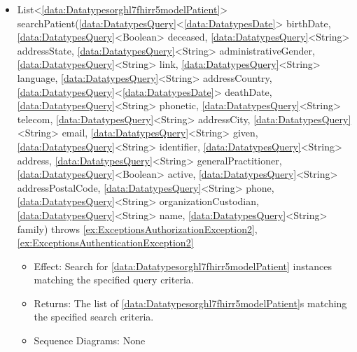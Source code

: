 \begin{description}
\begin{itemize}[noitemsep,nolistsep,leftmargin=-.25cm]
      \item \textsf{List\textless{}\ref{data:Datatypesorghl7fhirr5modelPatient}\textgreater{} searchPatient(\ref{data:DatatypesQuery}\textless{}\ref{data:DatatypesDate}\textgreater{} birthDate, \ref{data:DatatypesQuery}\textless{}Boolean\textgreater{} deceased, \ref{data:DatatypesQuery}\textless{}String\textgreater{} addressState, \ref{data:DatatypesQuery}\textless{}String\textgreater{} administrativeGender, \ref{data:DatatypesQuery}\textless{}String\textgreater{} link, \ref{data:DatatypesQuery}\textless{}String\textgreater{} language, \ref{data:DatatypesQuery}\textless{}String\textgreater{} addressCountry, \ref{data:DatatypesQuery}\textless{}\ref{data:DatatypesDate}\textgreater{} deathDate, \ref{data:DatatypesQuery}\textless{}String\textgreater{} phonetic, \ref{data:DatatypesQuery}\textless{}String\textgreater{} telecom, \ref{data:DatatypesQuery}\textless{}String\textgreater{} addressCity, \ref{data:DatatypesQuery}\textless{}String\textgreater{} email, \ref{data:DatatypesQuery}\textless{}String\textgreater{} given, \ref{data:DatatypesQuery}\textless{}String\textgreater{} identifier, \ref{data:DatatypesQuery}\textless{}String\textgreater{} address, \ref{data:DatatypesQuery}\textless{}String\textgreater{} generalPractitioner, \ref{data:DatatypesQuery}\textless{}Boolean\textgreater{} active, \ref{data:DatatypesQuery}\textless{}String\textgreater{} addressPostalCode, \ref{data:DatatypesQuery}\textless{}String\textgreater{} phone, \ref{data:DatatypesQuery}\textless{}String\textgreater{} organizationCustodian, \ref{data:DatatypesQuery}\textless{}String\textgreater{} name, \ref{data:DatatypesQuery}\textless{}String\textgreater{} family) throws \ref{ex:ExceptionsAuthorizationException2}, \ref{ex:ExceptionsAuthenticationException2}}
        \begin{itemize}[noitemsep,nolistsep]
           \item Effect: Search for \ref{data:Datatypesorghl7fhirr5modelPatient} instances matching the specified query criteria. 
           \item Returns: The list of \ref{data:Datatypesorghl7fhirr5modelPatient}s matching the specified search criteria.
           \item Sequence Diagrams: None
        \end{itemize}

\end{itemize}
\end{description}
